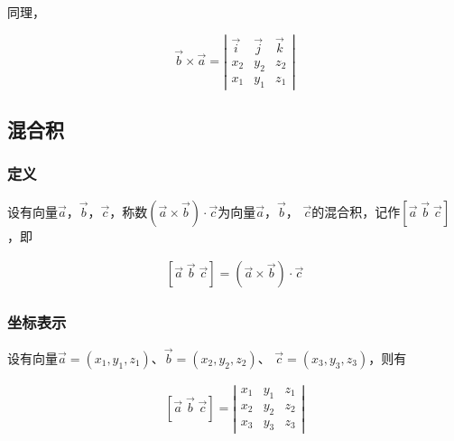 \documentclass[12pt, a4paper]{article}
\numberwithin{equation}{section}
\begin{document}
    同理，

    \[
        \overrightarrow{b} \times \overrightarrow{a} =
        \left|
            \begin{array}{cccc}
            \overrightarrow{i} & \overrightarrow{j} & \overrightarrow{k} \\
            x_2 & y_2 & z_2 \\
            x_1 & y_1 & z_1
            \end{array}
        \right|
    \]

\subsection{混合积}

\subsubsection{定义}

    设有向量\(\overrightarrow{a}\)，\(\overrightarrow{b}\)，\(\overrightarrow{c}\)，称数\(\left(\overrightarrow{a}
    \times \overrightarrow{b}\right) \cdot \overrightarrow{c}\)为向量\(\overrightarrow{a}\)，\(\overrightarrow{b}\)，
    \(\overrightarrow{c}\)的混合积，记作\(\left[\overrightarrow{a} \; \overrightarrow{b} \;
    \overrightarrow{c}\right]\)，即

    \begin{align}
        \left[\overrightarrow{a} \; \overrightarrow{b} \; \overrightarrow{c}\right] =
        \left(\overrightarrow{a} \times \overrightarrow{b}\right) \cdot \overrightarrow{c}
    \end{align}

\subsubsection{坐标表示}

    设有向量\(\overrightarrow{a} = \left(x_1, y_1, z_1\right)\)、\(\overrightarrow{b} = \left(x_2, y_2, z_2\right)\)、
    \(\overrightarrow{c} = \left(x_3, y_3, z_3\right)\)，则有

    \begin{align}
        \left[\overrightarrow{a} \; \overrightarrow{b} \; \overrightarrow{c}\right] =
        \left|
            \begin{array}{cccc}
            x_1 & y_1 & z_1 \\
            x_2 & y_2 & z_2 \\
            x_3 & y_3 & z_3
            \end{array}
        \right|
    \end{align}
\end{document}

